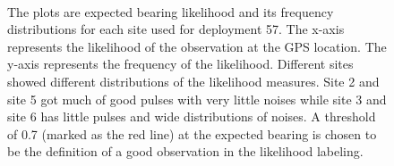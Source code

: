 \documentclass[twoside]{article}
\begin{document}
\begin{figure}[ht!]
     \begin{center}
%
        \\ %
%
    \end{center}
    \caption{%
       The plots are expected bearing likelihood and its frequency distributions for each site used for deployment 57.  The x-axis represents the likelihood of the observation at the GPS location. The y-axis represents the frequency of the likelihood. Different sites showed different distributions of the likelihood measures. Site 2 and site 5 got much of good pulses with very little noises while site 3 and site 6 has little pulses and wide distributions of noises. A threshold of 0.7 (marked as the red line) at the expected bearing is chosen to be the definition of a good observation in the likelihood labeling.
     }%
   \label{fig:subfigures}
\end{figure}
\end{document}
